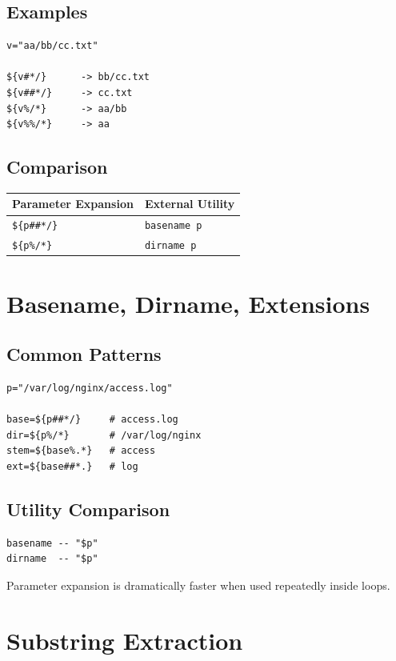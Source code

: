 \documentclass[11pt]{article}
\begin{document}
\subsection{Examples}

\begin{lstlisting}
v="aa/bb/cc.txt"

${v#*/}      -> bb/cc.txt
${v##*/}     -> cc.txt
${v%/*}      -> aa/bb
${v%%/*}     -> aa
\end{lstlisting}

\subsection{Comparison}

\begin{tabular}{ll}
\toprule
Parameter Expansion & External Utility \\
\midrule
\texttt{\$\{p\#\#*/\}} & \texttt{basename p} \\
\texttt{\$\{p\%/*\}} & \texttt{dirname p}  \\
\bottomrule
\end{tabular}

\section{Basename, Dirname, Extensions}

\subsection{Common Patterns}

\begin{lstlisting}
p="/var/log/nginx/access.log"

base=${p##*/}     # access.log
dir=${p%/*}       # /var/log/nginx
stem=${base%.*}   # access
ext=${base##*.}   # log
\end{lstlisting}

\subsection{Utility Comparison}

\begin{lstlisting}
basename -- "$p"
dirname  -- "$p"
\end{lstlisting}

Parameter expansion is dramatically faster when used repeatedly inside loops.

\section{Substring Extraction}
\end{document}
